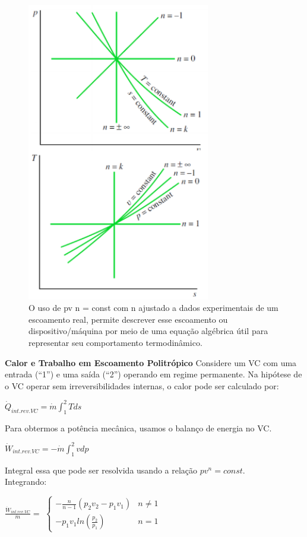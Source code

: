\documentclass[a4paper, 12pt]{article}
\begin{document}
	\begin{figure}[h]
		\includegraphics[width = 8cm]{ccc.png}
		\centering
		\caption{O uso de pv
			n = const com n ajustado a dados experimentais de um
			escoamento real, permite descrever esse escoamento ou dispositivo/máquina
			por meio de uma equação algébrica útil para representar seu comportamento
			termodinâmico.}
	\end{figure}

\newpage
\textbf{Calor e Trabalho em Escoamento Politrópico}
Considere um VC com uma entrada (“1”) e uma saída (“2”) operando em regime
permanente. Na hipótese de o VC operar sem irreversibilidades internas, o calor pode ser calculado por:
	\begin{center}
		\large
		$ \dot{Q}_{int.rev.VC} = \dot{m} \int_1^2 Tds$
	\end{center}

Para obtermos a potência mecânica, usamos o balanço de energia no VC.
	\begin{center}
		\large
		$ \dot{W}_{int.rev.VC} = -\dot{m}\int_{1}^{2}vdp $
	\end{center}

Integral essa que pode ser resolvida usando a relação $ pv^n = const $.\\Integrando:
	\begin{center}
		\large
		$ \frac{\dot{W}_{int.rev.VC}}{\dot{m}} = $
		$\left\{
		\begin{array}{cl}
			-\frac{n}{n - 1}(p_2v_2-p_1v_1) & n\neq 1\\
			-p_1v_1ln(\frac{p_2}{p_1}) & n = 1
		\end{array}
		\right.$
	\end{center}
\end{document}
